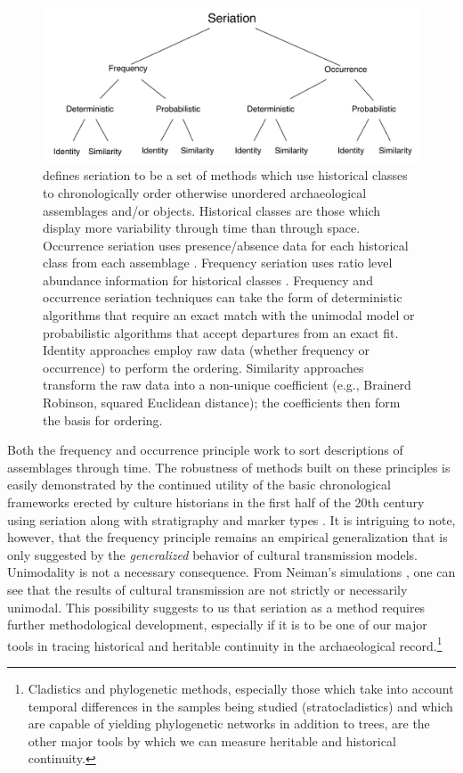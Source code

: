 \begin{figure}[ht]
\centering
\includegraphics[scale=0.6]{graphics/multipleseriation/seriation-methods.pdf}
\caption{\citet{Dunnell1981} defines seriation to be a set of methods which use historical classes to chronologically order otherwise unordered archaeological assemblages and/or objects. Historical classes are those which display more variability through time than through space. Occurrence seriation uses presence/absence data for each historical class from each assemblage \citep{Kroeber1916,Petrie:1899aa}. Frequency seriation uses ratio level abundance information for historical classes \citep{Spier1917,Ford:1935aa,Ford:1962aa}. Frequency and occurrence seriation techniques can take the form of deterministic algorithms that require an exact match with the unimodal model or probabilistic algorithms that accept departures from an exact fit. Identity approaches employ raw data (whether frequency or occurrence) to perform the ordering. Similarity approaches transform the raw data into a non-unique coefficient (e.g., Brainerd Robinson, squared Euclidean distance); the coefficients then form the basis for ordering.}
\label{img:seriation-methods}
\end{figure}

Both the frequency and occurrence principle work to sort descriptions of
assemblages through time. The robustness of methods built on these
principles is easily demonstrated by the continued utility of the basic
chronological frameworks erected by culture historians in the first half
of the 20th century using seriation along with stratigraphy and marker
types \citep{lyman1997rise}. It is intriguing to note, however, that the
frequency principle remains an empirical generalization that is only
suggested by the \emph{generalized} behavior of cultural transmission models.  Unimodality is not a necessary consequence. 
From Neiman's simulations
\citep[i.e.,][]{Neiman1995}, one can see that the results of cultural
transmission are not strictly or necessarily unimodal. This possibility
suggests to us that seriation as a method requires further
methodological development, especially if it is to be one of our major
tools in tracing historical and heritable continuity in the
archaeological record.\footnote{Cladistics and phylogenetic methods,
  especially those which take into account temporal differences in the
  samples being studied (stratocladistics) and which are capable of
  yielding phylogenetic networks in addition to trees, are the other
  major tools by which we can measure heritable and historical
  continuity.}


